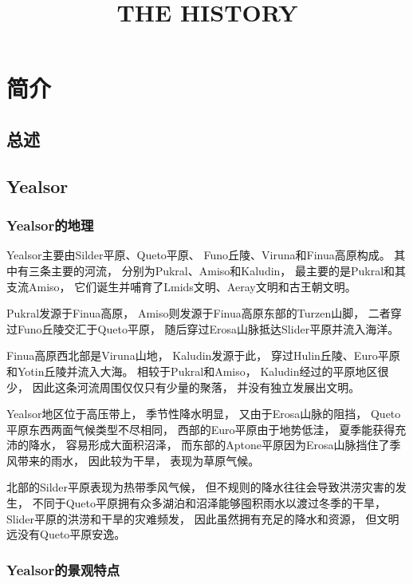 \documentclass[UTF8,12pt]{ctexbook}
\title{\textbf{THE HISTORY}}
\author{}
\date{}
\begin{document}
\maketitle
\tableofcontents
\chapter{简介}
    \section{总述}
    \section{Yealsor}
        \subsection{Yealsor的地理}
        Yealsor主要由Silder平原、Queto平原、
        Funo丘陵、Viruna和Finua高原构成。
        其中有三条主要的河流，
        分别为Pukral、Amiso和Kaludin，
        最主要的是Pukral和其支流Amiso，
        它们诞生并哺育了Lmids文明、Aeray文明和古王朝文明。

        Pukral发源于Finua高原，
        Amiso则发源于Finua高原东部的Turzen山脚，
        二者穿过Funo丘陵交汇于Queto平原，
        随后穿过Erosa山脉抵达Slider平原并流入海洋。

        Finua高原西北部是Viruna山地，
        Kaludin发源于此，
        穿过Hulin丘陵、Euro平原和Yotin丘陵并流入大海。
        相较于Pukral和Amiso，
        Kaludin经过的平原地区很少，
        因此这条河流周围仅仅只有少量的聚落，
        并没有独立发展出文明。
        
        Yealsor地区位于高压带上，
        季节性降水明显，
        又由于Erosa山脉的阻挡，
        Queto平原东西两面气候类型不尽相同，
        西部的Euro平原由于地势低洼，
        夏季能获得充沛的降水，
        容易形成大面积沼泽，
        而东部的Aptone平原因为Erosa山脉挡住了季风带来的雨水，
        因此较为干旱，
        表现为草原气候。

        北部的Silder平原表现为热带季风气候，
        但不规则的降水往往会导致洪涝灾害的发生，
        不同于Queto平原拥有众多湖泊和沼泽能够囤积雨水以渡过冬季的干旱，
        Slider平原的洪涝和干旱的灾难频发，
        因此虽然拥有充足的降水和资源，
        但文明远没有Queto平原安逸。
        \subsection{Yealsor的景观特点}
\end{document}
